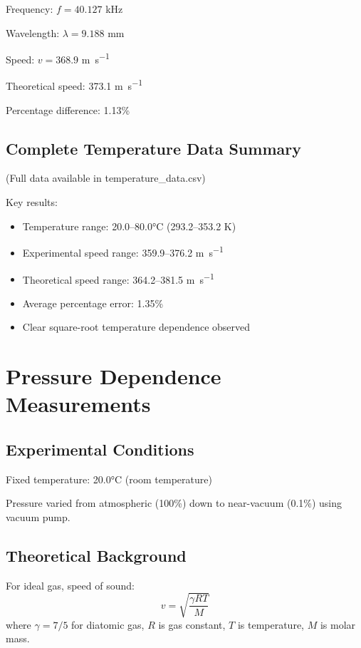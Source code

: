 \documentclass[12pt]{article}
\begin{document}
Frequency: $f = 40.127$ \si{\kilo\hertz}

Wavelength: $\lambda = 9.188$ \si{\milli\meter}

Speed: $v = 368.9$ \si{\meter\per\second}

Theoretical speed: 373.1 \si{\meter\per\second}

Percentage difference: 1.13\%

\subsection{Complete Temperature Data Summary}

(Full data available in temperature\_data.csv)

Key results:
\begin{itemize}
    \item Temperature range: 20.0--80.0°C (293.2--353.2 K)
    \item Experimental speed range: 359.9--376.2 \si{\meter\per\second}
    \item Theoretical speed range: 364.2--381.5 \si{\meter\per\second}
    \item Average percentage error: 1.35\%
    \item Clear square-root temperature dependence observed
\end{itemize}

\section{Pressure Dependence Measurements}

\subsection{Experimental Conditions}

Fixed temperature: 20.0°C (room temperature)

Pressure varied from atmospheric (100\%) down to near-vacuum (0.1\%) using vacuum pump.

\subsection{Theoretical Background}

For ideal gas, speed of sound:
\begin{equation}
v = \sqrt{\frac{\gamma RT}{M}}
\end{equation}
where $\gamma = 7/5$ for diatomic gas, $R$ is gas constant, $T$ is temperature, $M$ is molar mass.
\end{document}
